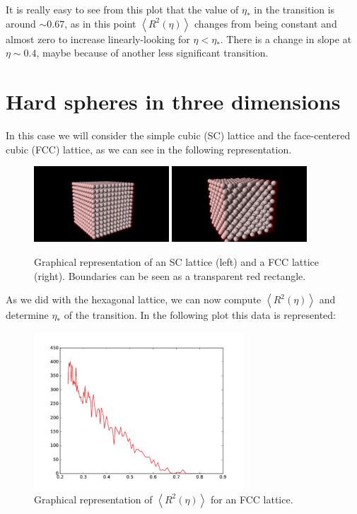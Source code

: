 \documentclass[10 pt]{article}
\newcommand{\avg}[1]{\left\langle #1 \right\rangle}
\begin{document}
It is really easy to see from this plot that the value of $\eta_*$ in the transition is around $\sim 0.67$, as in this point $\avg{R^2(\eta)}$ changes from being constant and almost zero to increase linearly-looking for $\eta < \eta_*$. There is a change in slope at $\eta \sim 0.4$, maybe because of another less significant transition.

\section{Hard spheres in three dimensions}

In this case we will consider the simple cubic (SC) lattice and the face-centered cubic (FCC) lattice, as we can see in the following representation.

\begin{figure}[H]
  \begin{center}
    \includegraphics[width=0.45\textwidth]{../graphs/sc.png}
    \includegraphics[width=0.45\textwidth]{../graphs/fcc.png}
    \caption{Graphical representation of an SC lattice (left) and a FCC lattice (right). Boundaries can be seen as a transparent red rectangle.}
  \end{center}
\end{figure}

As we did with the hexagonal lattice, we can now compute $\avg{R^2(\eta)}$ and determine $\eta_*$ of the transition. In the following plot this data is represented:

\begin{figure}[H]
  \begin{center}
    \includegraphics[width=0.7\textwidth]{../graphs/fcc-melting.pdf}
    \caption{Graphical representation of $\avg{R^2(\eta)}$ for an FCC lattice.}
  \end{center}
\end{figure}
\end{document}
